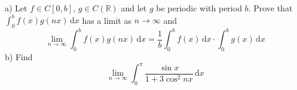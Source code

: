 a) Let $f\in C[0,b]$, $g\in C(\mathbb R)$ and let $g$ be periodic with period $b$. Prove that $\int_0^b f(x) g(nx)\,\mathrm dx$ has a limit as $n\to\infty$ and
$$\lim_{n\to\infty}\int_0^b f(x)g(nx)\,\mathrm dx=\frac 1b \int_0^b f(x)\,\mathrm dx\cdot\int_0^b g(x)\,\mathrm dx$$
b) Find
$$\lim_{n\to\infty}\int_0^\pi \frac{\sin x}{1+3\cos^2nx}\,\mathrm dx$$